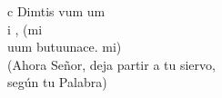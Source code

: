 \begin{cancion}%
	c Dimtis vum um \\
	i , (mi\\
	uum butuunace. mi)\\
(Ahora Señor, deja partir a tu siervo,\\
 según tu Palabra)\\
\end{cancion}%
